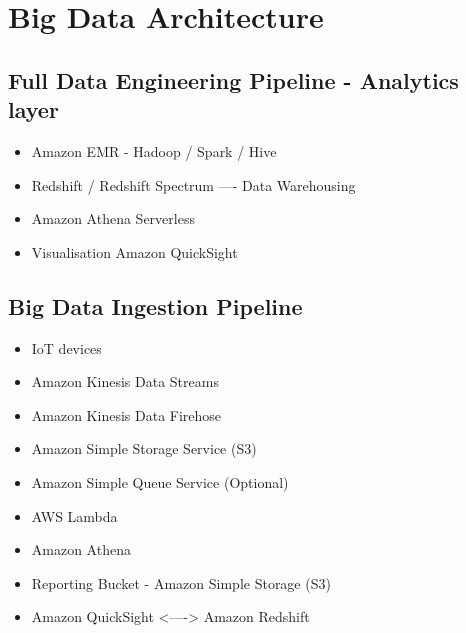 \section{Big Data Architecture}

\subsection{Full Data Engineering Pipeline - Analytics layer}
\begin{itemize}
    \item Amazon EMR - Hadoop / Spark / Hive
    \item Redshift / Redshift Spectrum ---- Data Warehousing
    \item Amazon Athena Serverless
    \item Visualisation Amazon QuickSight
\end{itemize}

\subsection{Big Data Ingestion Pipeline}
\begin{itemize}
    \item IoT devices
    \item Amazon Kinesis Data Streams
    \item Amazon Kinesis Data Firehose
    \item Amazon Simple Storage Service (S3)
    \item Amazon Simple Queue Service (Optional)
    \item AWS Lambda
    \item Amazon Athena
    \item Reporting Bucket - Amazon Simple Storage (S3)
    \item Amazon QuickSight <----> Amazon Redshift
\end{itemize}


